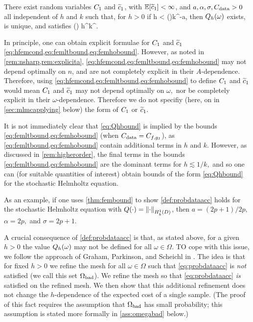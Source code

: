 \label{def:probdataacc}
There exist random variables $C_{1}$ and $\widetilde{c}_{1}$, with $\EXP{\cotilde} < \infty$, and $a, \alpha, \sigma, C_{\mathrm{data}} > 0$ all independent of $h$ and $k$ such that, for $h>0$ if
\beq\label{eq:probdataacc}
h < \Co(\omega)k^{-a},
\eeq
then $Q_{h}(\omega)$ exists, is unique, and satisfies
\beq\label{eq:Qhbound}
 \leq \cotilde(\omega) h^\alpha k^\sigma \Cdata.
\eeq
\eas

\bit
\item In principle, one can obtain explicit formulae for $C_{1}$ and $\widetilde{c}_{1}$ \cref{eq:hfemcond,eq:femltbound,eq:femhobound}. However, as noted in \cref{rem:nsharp,rem:explicita}, \cref{eq:hfemcond,eq:femltbound,eq:femhobound} may not depend optimally on $n$, and are not completely explicit in their $A$-dependence. Therefore, using \cref{eq:hfemcond,eq:femltbound,eq:femhobound} to define $C_{1}$ and $\widetilde{c}_{1}$ would mean $C_{1}$ and $\widetilde{c}_{1}$ may not depend optimally on $\omega,$ nor be completely explicit in their $\omega$-dependence. Therefore we do not specifiy (here, on in \cref{sec:mlmcapplying} below) the form of $C_{1}$ or $\widetilde{c}_{1}.$
\item It is not immediately clear that \cref{eq:Qhbound} is implied by the bounds \cref{eq:femltbound,eq:femhobound} (when $C_{\mathrm{data}} = C_{f,g_{I}}$), as \cref{eq:femltbound,eq:femhobound} contain additional terms in $h$ and $k.$ However, as discussed in \cref{rem:higherorder}, the final terms in the bounds \cref{eq:femltbound,eq:femhobound} are the dominant terms for $h \lesssim 1/k,$ and so one can (for suitable quantities of interest) obtain bounds of the form \cref{eq:Qhbound} for the stochastic Helmholtz equation.
  \item As an example, if one uses \cref{thm:fembound} to show \cref{def:probdataacc} holds for the stochastic Helmholtz equation with $Q(\cdot)=\NHokD{\cdot}$, then $a = (2p+1)/2p,$ $\alpha=2p,$ and $\sigma = 2p+1$.
\eit
\ere

A crucial consequence of \cref{def:probdataacc} is that, as stated above, for a given $h>0$ the value $Q_{h}(\omega)$ may not be defined for all $\omega \in \Omega.$ TO cope with this issue, we follow the approach of Graham, Parkinson, and Scheichl in \cite{GrPaSc:19}. The idea is that for fixed $h>0$ we refine the mesh for all $\omega \in \Omega$ such that \cref{eq:probdataacc} is \emph{not} satisfied (we call this set $\Omega_{\mathrm{bad}}$). We refine the mesh so that \cref{eq:probdataacc} \emph{is} satisfied on the refined mesh. We then show that this additional refinement does not change the $h$-dependence of the expected cost of a single sample. (The proof of this fact requires the assumption that $\Omega_{\mathrm{bad}}$ has small probability; this assumption is stated more formally in \cref{ass:omegabad} below.)

